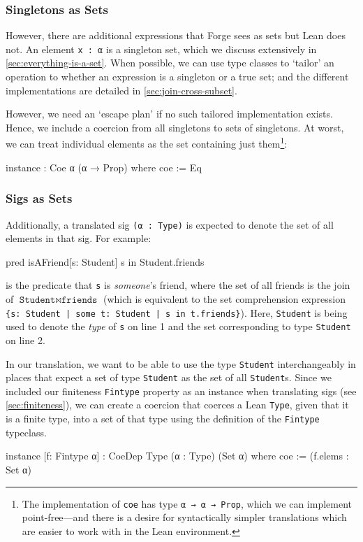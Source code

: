 \subsubsection{Singletons as Sets}

However, there are additional expressions that Forge sees as sets but Lean does not. An element \texttt{x : α} is a singleton set, which we discuss extensively in \cref{sec:everything-is-a-set}. When possible, we can use type classes to `tailor' an operation to whether an expression is a singleton or a true set; and the different implementations are detailed in \cref{sec:join-cross-subset}. 

However, we need an `escape plan' if no such tailored implementation exists. Hence, we include a coercion from all singletons to sets of singletons. At worst, we can treat individual elements as the set containing just them\footnote{The implementation of \texttt{coe} has type \texttt{α → α → Prop}, which we can implement point-free---and there is a desire for syntactically simpler translations which are easier to work with in the Lean environment.}: 
\begin{leanimpl*}
instance : Coe α (α → Prop) where
  coe := Eq
\end{leanimpl*}

\subsubsection{Sigs as Sets}

Additionally, a translated sig \texttt{(α : Type)} is expected to denote the set of all elements in that sig. For example:
\begin{forge}
pred isAFriend[s: Student] {
  s in Student.friends
}
\end{forge}
is the predicate that \texttt{s} is \emph{someone}'s friend, where the set of all friends is the join of $\texttt{Student} \bowtie \texttt{friends}$ (which is equivalent to the set comprehension expression \texttt{\{s: Student | some t: Student | s in t.friends\}}). Here, \texttt{Student} is being used to denote the \emph{type} of \texttt{s} on line 1 and the set corresponding to type \texttt{Student} on line 2. 

In our translation, we want to be able to use the type \texttt{Student} interchangeably in places that expect a set of type \texttt{Student} as the set of all \texttt{Student}s. Since we included our finiteness \texttt{Fintype} property as an instance when translating sigs (see \cref{sec:finiteness}), we can create a coercion that coerces a Lean \texttt{Type}, given that it is a finite type, into a set of that type using the definition of the \texttt{Fintype} typeclass. 
\begin{leanimpl*}
instance [f: Fintype α] : CoeDep Type (α : Type) (Set α) where
  coe := (f.elems : Set α)
\end{leanimpl*}


